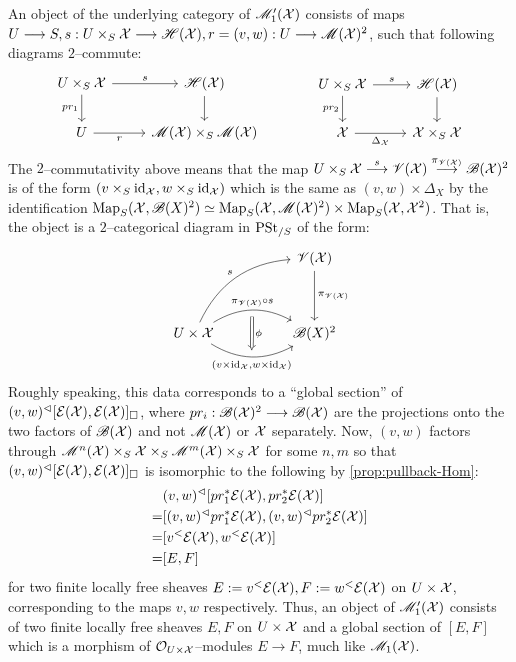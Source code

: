 \documentclass[11pt]{amsart}
\begin{document}
\begin{rmk}\label{rmk:mod-prest-arr-sec}
An object of the underlying category of $\mathscr{M}_1'(\mathcal{X})$
consists of maps
$U \to S, s : U \times_S \mcX \to \sH(\mcX),
r = (v, w) : U \to \sM(\mcX)^2$, such that following diagrams $2$--commute:
\[\begin{tikzcd}
U \times_S \mcX \ar[r, "s"] \ar[d, "pr_1" left] & \sH(\mcX) \ar[d] \\
U \ar[r, "r" below] & \sM(\mcX) \times_S \sM(\mcX)
\end{tikzcd}\hspace{3.5em}
\begin{tikzcd}
U \times_S \mcX \ar[r, "s"] \ar[d, "pr_2" left] & \sH(\mcX) \ar[d] \\
\mcX \ar[r, "\Delta_\mcX" below] & \mcX \times_S \mcX
\end{tikzcd}\]
The $2$--commutativity above means that the map
$U \times_S \mcX \to[s] \sV(\mcX) \to[\pi_{\sV(\mcX)}] \sB(\mcX)^2$
is of the form $(v \times_S \mathrm{id}_\mathcal{X}, w \times_S \mathrm{id}_\mathcal{X})$
which is the same as $(v, w) \times \Delta_X$ by the identification
$\mathrm{Map}_S(\mathcal{X}, \mathscr{B}(X)^2) \simeq
\mathrm{Map}_S(\mathcal{X}, \mathscr{M}(\mathcal{X})^2) \times \mathrm{Map}_S(\mathcal{X}, \mathcal{X}^2)$.
That is, the object is a $2$--categorical diagram in $\mathrm{PSt}_{/S}$ of the form:
\[\begin{tikzcd}[row sep={huge}, column sep=huge]
& \sV(\mcX) \ar[d, "\pi_{\sV(\mcX)}"] \\
U \times \mcX
  \ar[r, bend left, ""{below, name=U},
    "\pi_{\sV(\mcX)} \circ s" above]
  \ar[r, bend right, ""{above, name=D},
    "{(v \times \id_\mcX, w \times \id_\mcX)}" below]
  \ar[ru, bend left, "s" above left]
  \ar[from=U, to=D, Rightarrow, "\phi"] &
\sB(X)^2
\end{tikzcd}\]
Roughly speaking, this data corresponds to a ``global section''
of $(v, w)^\lhd[\mathcal{E}(\mathcal{X}), \mathcal{E}(\mathcal{X})]_{\square}$, where
$pr_i : \sB(\mcX)^2 \to \sB(\mcX)$ are the projections onto the two factors
of $\mathscr{B}(\mathcal{X})$ and not $\mathscr{M}(\mathcal{X})$ or $\mathcal{X}$ separately.
Now, $(v, w)$ factors through
$\mathscr{M}^n(\mathcal{X}) \times_S \mathcal{X} \times_S \mathscr{M}^m(\mathcal{X}) \times_S \mathcal{X}$ for some $n, m$
so that $(v, w)^\lhd[\mathcal{E}(\mathcal{X}), \mathcal{E}(\mathcal{X})]_{\square}$
is isomorphic to the following by \cref{prop:pullback-Hom}:
\begin{align*}
 & (v, w)^\lhd[pr_1^*\mathcal{E}(\mathcal{X}), pr_2^*\mathcal{E}(\mathcal{X})] \\
=& [(v, w)^\lhd pr_1^*\mathcal{E}(\mathcal{X}), (v, w)^\lhd pr_2^*\mathcal{E}(\mathcal{X})] \\
=& [v^< \mathcal{E}(\mathcal{X}), w^< \mathcal{E}(\mathcal{X})] \\
=& [E, F]
\end{align*}
for two finite locally free sheaves
$E := v^<\mathcal{E}(\mathcal{X}), F := w^<\mathcal{E}(\mathcal{X})$ on $U \times \mathcal{X}$, corresponding to
the maps $v, w$ respectively.
Thus, an object of $\mathscr{M}_1'(\mathcal{X})$ consists of
two finite locally free sheaves $E, F$ on $U \times \mathcal{X}$ and a global
section of $[E, F]$ which is a morphism of $\mathcal{O}_{U \times \mathcal{X}}$--modules
$E \to F$, much like $\mathscr{M}_1(\mathcal{X})$.
\end{rmk}
\end{document}
